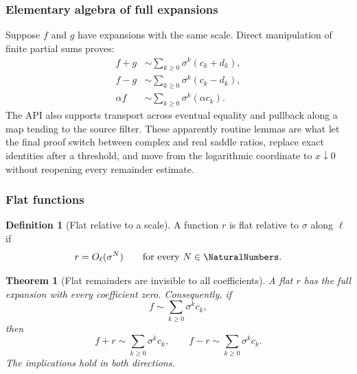 \documentclass[11pt,oneside]{article}
\newtheorem{theorem}{Theorem}[section]
\theoremstyle{definition}
\newtheorem{definition}[definition]{Definition}
\theoremstyle{remark}
\begin{document}
\subsubsection{Elementary algebra of full expansions}

Suppose $f$ and $g$ have expansions with the same scale.  Direct manipulation of finite
partial sums proves:
\begin{align}
 f+g&\sim\sum_{k\ge0}\sigma^k(c_k+d_k),                    \label{integration:eq:expansion-add}\\
 f-g&\sim\sum_{k\ge0}\sigma^k(c_k-d_k),                    \label{integration:eq:expansion-sub}\\
 \alpha f&\sim\sum_{k\ge0}\sigma^k(\alpha c_k).            \label{integration:eq:expansion-smul}
\end{align}
The API also supports transport across eventual equality and pullback along a map tending to
the source filter.  These apparently routine lemmas are what let the final proof switch
between complex and real saddle ratios, replace exact identities after a threshold, and move
from the logarithmic coordinate to $x\downarrow0$ without reopening every remainder
estimate.

\subsubsection{Flat functions}

\begin{definition}[Flat relative to a scale]
\label{integration:def:flat-scale}
A function $r$ is flat relative to $\sigma$ along $\ell$ if
\begin{equation}
 r=O_{\ell}(\sigma^N)
 \qquad\text{for every }N\in\NaturalNumbers.
 \label{integration:eq:flat-all-orders}
\end{equation}
\end{definition}

\begin{theorem}[Flat remainders are invisible to all coefficients]
\label{integration:thm:flat-invisible}
A flat $r$ has the full expansion with every coefficient zero.  Consequently, if
\begin{equation}
 f\sim\sum_{k\ge0}\sigma^kc_k,
 \label{integration:eq:f-exp-before-flat}
\end{equation}
then
\begin{equation}
 f+r\sim\sum_{k\ge0}\sigma^kc_k,
 \qquad
 f-r\sim\sum_{k\ge0}\sigma^kc_k.
 \label{integration:eq:flat-preserves-expansion}
\end{equation}
The implications hold in both directions.
\end{theorem}
\end{document}
